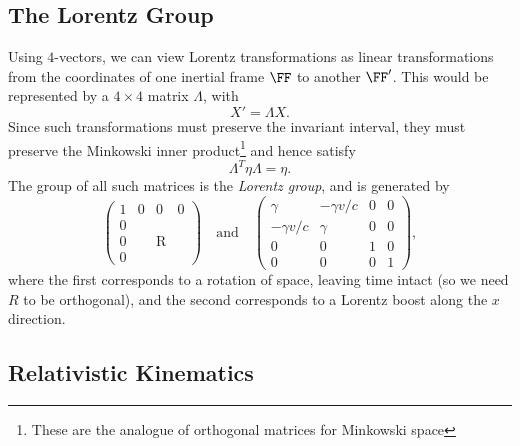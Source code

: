 \documentclass[a4paper]{scrartcl}
\begin{document}
\subsection{The Lorentz Group}

Using $4$-vectors, we can view Lorentz transformations as linear transformations from the coordinates of one inertial frame $\FF$ to another $\FF'$. This would be represented by a $4 \times 4$ matrix $\Lambda$, with
$$
X' = \Lambda X.
$$
Since such transformations must preserve the invariant interval, they must preserve the Minkowski inner product\footnote{These are the analogue of orthogonal matrices for Minkowski space} and hence satisfy
$$
\Lambda^T \eta \Lambda = \eta.
$$
The group of all such matrices is the \emph{Lorentz group}, and is generated by 
$$
\left(\begin{array}{c|ccc}
	1 & 0 & 0 & 0 \\
	\hline 0 & & & \\
	0 & & \mathrm{R} & \\
	0 & & &
	\end{array}\right) 
	\quad \text{and} \quad \left(\begin{array}{cc|cc}
		\gamma & -\gamma v / c & 0 & 0 \\
		-\gamma v / c & \gamma & 0 & 0 \\
		\hline 0 & 0 & 1 & 0 \\
		0 & 0 & 0 & 1
		\end{array}\right),
$$
where the first corresponds to a rotation of space, leaving time intact (so we need $R$ to be orthogonal), and the second corresponds to a Lorentz boost along the $x$ direction.

\subsection{Relativistic Kinematics}
\end{document}
